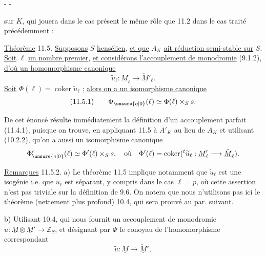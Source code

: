 \begin{center}-  -\end{center}

sur $K$, qui jouera dans le cas présent le même rôle que 11.2 dans le cas traité précédemment :

\uline{Théorème} 11.5. \uline{Supposons} $S$ \uline{hensélien}, \uline{et que} $A_K$ \uline{ait réduction semi-stable sur} $S$. \uline{Soit} $\ell$ \uline{un nombre premier}, \uline{et considérons l'accouplement de monodromie} (9.1.2), \uline{d'où un homomorphisme canonique}
\[
 \widetilde u_\ell:\underline M_\ell\longrightarrow\check{\underline M}'_\ell.
\]
\uline{Soit} $\Phi(\ell)=\operatorname{coker}\widetilde u_\ell$ ; \uline{alors on a un isomorphisme canonique}
\[
(11.5.1)\qquad\Phi_{\unsure{o|0}}(\ell)\simeq\Phi(\ell)\times_Ss.
\]

De cet énoncé résulte immédiatement la définition d'un accouplement parfait (11.4.1), puisque on trouve, en appliquant 11.5 à $A'_K$ au lieu de $A_K$ et utilisant (10.2.2), qu'on a aussi un isomorphisme canonique
\[
\Phi'_{\unsure{o|0}}(\ell)\simeq\Phi'(\ell)\times_Ss,\quad\text{où}\quad
\Phi'(\ell)=\operatorname{coker}({}^t\widetilde u_\ell:\underline M'_\ell\longrightarrow\check{\underline M}_\ell).
\]

\uline{Remarques} 11.5.2. a) Le théorème 11.5 implique notamment que $\widetilde u_\ell$ est une isogénie i.e. que $u_\ell$ est séparant, y compris dans le cas $\ell=p$, où cette assertion n'est pas triviale sur la définition de 9.6. On notera que nous n'utilisons pas ici le théorème (nettement plus profond) 10.4, qui sera prouvé au par. suivant.

b) Utilisant 10.4, qui nous fournit un accouplement de monodromie $u:\underline M\otimes\underline M'\longrightarrow\mathbb Z_S$, et désignant par $\Phi$ le conoyau de l'homomorphisme correspondant
\[
 \widetilde u:\underline M\longrightarrow\check{\underline M}',
\]
